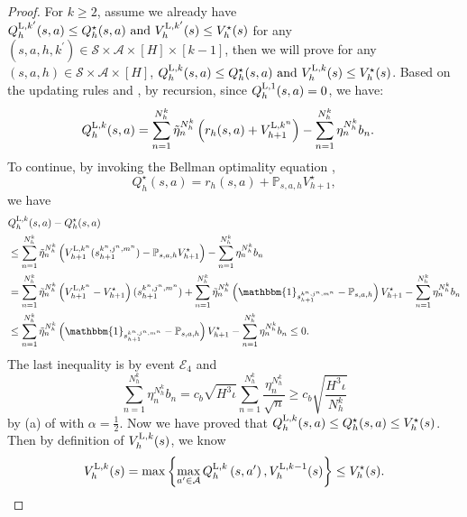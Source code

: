 \documentclass{article}
\newcommand{\LL}{\textnormal{L}}
\begin{document}
\begin{proof}
    For $k \geq 2$, assume we already have $Q_h^{\LL, k'}(s, a) \leq Q_h^\star(s, a)  \textnormal{ and } V_h^{\LL,k'}(s) \leq V_h^\star(s)$ for any $(s,a,h,k^\prime) \in \mathcal{S} \times \mathcal{A} \times [H] \times [k-1]$, then we will prove for any $(s,a,h) \in \mathcal{S} \times \mathcal{A} \times [H]$, $Q_h^{\LL, k}(s, a) \leq Q_h^\star(s, a) \textnormal{ and } V_h^{\LL,k}(s) \leq V_h^\star(s)$.
    Based on the updating rules  and , by recursion, since $Q_h^{\LL,1}(s,a) = 0$, we have:
    \begin{align*}
        Q_h^{\LL,k}(s,a) &= \sum_{n=1}^{N_h^k} \Tilde{\eta}_n^{N_h^k} \left( r_h(s, a) + V_{h+1}^{\LL,k^n}\right) - \sum_{n=1}^{N_h^k} \eta_n^{N_h^k}b_{n}.
    \end{align*}
    To continue, by invoking the Bellman optimality equation ,
    \begin{equation*}
        Q_h^{\star}(s, a) = r_h(s, a) + \mathbb{P}_{s,a,h} V_{h+1}^{\star},
    \end{equation*}
    we have
    \begin{align*}
         &Q_h^{\LL,k}(s,a) - Q_h^{\star}(s, a) \nonumber\\
         &\leq \sum_{n=1}^{N_h^k} \Tilde{\eta}_n^{N_h^k} \left( V_{h+1}^{\LL,k^n}(s_{h+1}^{k^n,j^n,m^n})-\mathbb{P}_{s,a,h} V_{h+1}^{\star}\right)- \sum_{n=1}^{N_h^k} \eta_n^{N_h^k}b_{n} \nonumber\\
         & = \sum_{n=1}^{N_h^k} \Tilde{\eta}_n^{N_h^k}  \left( V_{h+1}^{\LL,k^n}-V_{h+1}^{\star}\right)(s_{h+1}^{k^n,j^n,m^n}) + \sum_{n=1}^{N_h^k} \Tilde{\eta}_n^{N_h^k} \left( \mathbbm{1}_{s_{h+1}^{k^n,j^n,m^n}}-\mathbb{P}_{s,a,h}\right) V_{h+1}^{\star}- \sum_{n=1}^{N_h^k} \eta_n^{N_h^k}b_{n} \nonumber\\
         &\leq \sum_{n=1}^{N_h^k} \Tilde{\eta}_n^{N_h^k} \left( \mathbbm{1}_{s_{h+1}^{k^n,j^n,m^n}}-\mathbb{P}_{s,a,h}\right) V_{h+1}^{\star}- \sum_{n=1}^{N_h^k} \eta_n^{N_h^k}b_{n}
         \leq 0. 
    \end{align*}
    The last inequality is by event $\mathcal{E}_4$ and
    $$\sum_{n=1}^{N_h^k} \eta_n^{N_h^k}b_{n} = c_b\sqrt{H^3\iota}\sum_{n=1}^{N_h^k} \frac{\eta_n^{N_h^k}}{\sqrt{n}} \geq c_b \sqrt{\frac{H^3\iota}{N_h^k}}$$
    by (a) of  with $\alpha = \frac{1}{2}$.
    Now we have proved that $Q_h^{\LL,k}(s,a) \leq Q_h^{\star}(s, a) \leq V_h^{\star}(s) $. Then by definition  of $V_h^{\LL,k}(s)$, we know
    $$V_h^{\LL,k}(s) = \max \left\{ \max _{a^{\prime} \in \mathcal{A}} Q_h^{\LL, k}\left(s, a^{\prime}\right), V_h^{\LL, {k-1}}(s)\right\} \leq V_h^{\star}(s).$$
\end{proof}
\end{document}
